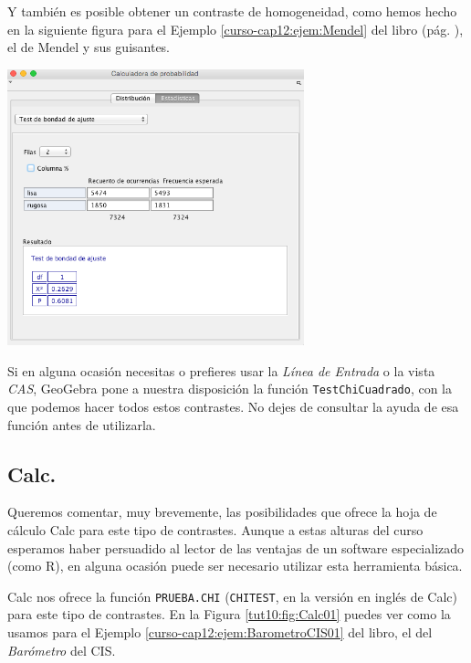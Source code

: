\documentclass[10pt,a4paper]{article}\usepackage[]{graphicx}\usepackage[]{color}
\newcounter {cont01}
\begin{document}
Y también es posible obtener un contraste de homogeneidad, como hemos hecho en la siguiente figura para el Ejemplo \ref{curso-cap12:ejem:Mendel} del libro (pág. \pageref{curso-cap12:ejem:Mendel}), el de Mendel y sus guisantes.
\begin{center}
    \includegraphics[height=8cm]{../fig/Tut12-GeoGebraChiCuadradoHomogeneidad.png}
\end{center}

Si en alguna ocasión necesitas o prefieres usar la {\em Línea de Entrada} o la vista {\em CAS}, GeoGebra pone a nuestra disposición la función {\tt TestChiCuadrado}, con la que podemos hacer todos estos contrastes. No dejes de consultar la ayuda de esa función antes de utilizarla.

\subsection{Calc.}

Queremos comentar, muy brevemente, las posibilidades que ofrece la hoja de cálculo Calc para este tipo de contrastes. Aunque a estas alturas del curso esperamos haber persuadido al lector de las ventajas de un software especializado (como R), en alguna ocasión puede ser necesario utilizar esta herramienta básica.

Calc nos ofrece la función {\tt PRUEBA.CHI} ({\tt CHITEST}, en la versión en inglés de Calc) para este tipo de contrastes. En la Figura \ref{tut10:fig:Calc01} puedes ver como la usamos para el Ejemplo \ref{curso-cap12:ejem:BarometroCIS01} del libro, el del {\em Barómetro} del CIS.
\end{document}
